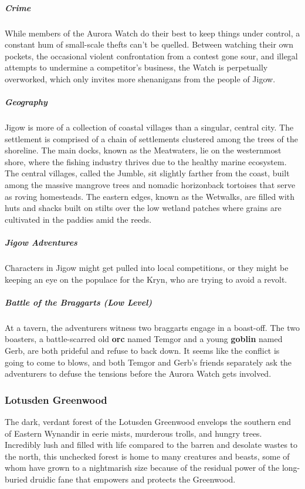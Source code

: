 \documentclass[10pt,a4paper,twoside,bg=print,twocolumn,openany,nodeprecatedcode]{dndbook}
\begin{document}
\subparagraph{Crime}
While members of the Aurora Watch do their best to keep things under control, a constant hum of small-scale thefts can't be quelled. Between watching their own pockets, the occasional violent confrontation from a contest gone sour, and illegal attempts to undermine a competitor's business, the Watch is perpetually overworked, which only invites more shenanigans from the people of Jigow.

\subparagraph{Geography}
Jigow is more of a collection of coastal villages than a singular, central city. The settlement is comprised of a chain of settlements clustered among the trees of the shoreline. The main docks, known as the Meatwaters, lie on the westernmost shore, where the fishing industry thrives due to the healthy marine ecosystem. The central villages, called the Jumble, sit slightly farther from the coast, built among the massive mangrove trees and nomadic horizonback tortoises that serve as roving homesteads. The eastern edges, known as the Wetwalks, are filled with huts and shacks built on stilts over the low wetland patches where grains are cultivated in the paddies amid the reeds.

\subparagraph{Jigow Adventures}
Characters in Jigow might get pulled into local competitions, or they might be keeping an eye on the populace for the Kryn, who are trying to avoid a revolt.

\subparagraph{Battle of the Braggarts (Low Level)}
At a tavern, the adventurers witness two braggarts engage in a boast-off. The two boasters, a battle-scarred old \textbf{orc} named Temgor and a young \textbf{goblin} named Gerb, are both prideful and refuse to back down. It seems like the conflict is going to come to blows, and both Temgor and Gerb's friends separately ask the adventurers to defuse the tensions before the Aurora Watch gets involved.

\subsubsection{Lotusden Greenwood}
The dark, verdant forest of the Lotusden Greenwood envelops the southern end of Eastern Wynandir in eerie mists, murderous trolls, and hungry trees. Incredibly lush and filled with life compared to the barren and desolate wastes to the north, this unchecked forest is home to many creatures and beasts, some of whom have grown to a nightmarish size because of the residual power of the long-buried druidic fane that empowers and protects the Greenwood.
\end{document}
